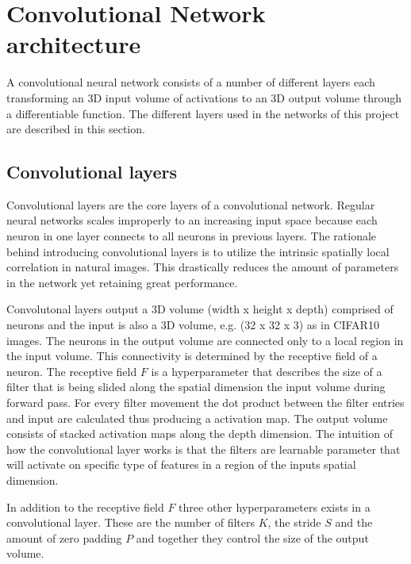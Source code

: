 \graphicspath{{Chapters/Project/}}

\section{Convolutional Network architecture} %
\label{sec:convolutional_network_architecture}

A convolutional neural network consists of a number of different layers each transforming an 3D input volume of activations to an 3D output volume through a differentiable function. The different layers used in the networks of this project are described in this section. 

\subsection{Convolutional layers} %
\label{sub:conv_layers}

Convolutional layers are the core layers of a convolutional network. Regular
neural networks scales improperly to an increasing input space because each
neuron in one layer connects to all neurons in previous layers. The rationale behind introducing convolutional layers is to utilize the intrinsic spatially local correlation in natural images. This drastically reduces the amount of parameters in the network yet retaining great performance.

Convolutonal layers output a 3D volume (width x height x depth) comprised of neurons and the input is also a 3D volume, e.g. (32 x 32 x 3) as in CIFAR10 images. The neurons in the output volume are connected only to a local region in the input volume. This connectivity is determined by the receptive field of a neuron. The receptive field $F$ is a hyperparameter that describes the size of a filter that is being slided along the spatial dimension the input volume during forward pass. For every filter movement the dot product between the filter entries and input are calculated thus producing a activation map. The output volume consists of stacked activation maps along the depth dimension. The intuition of how the convolutional layer works is that the filters are learnable parameter that will activate on specific type of features in a region of the inputs spatial dimension.

In addition to the receptive field $F$ three other hyperparameters exists in a convolutional layer. These are the number of filters $K$, the stride $S$ and the amount of zero padding $P$ and together they control the size of the output volume. 

